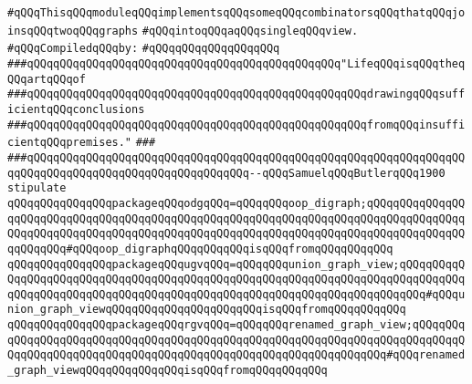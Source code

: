 \label{src/lib/graph/graph-combination.pkg}
\verb|#qQQqThisqQQqmoduleqQQqimplementsqQQqsomeqQQqcombinatorsqQQqthatqQQqjoinsqQQqtwoqQQqgraphs|\newline
\verb|#qQQqintoqQQqaqQQqsingleqQQqview.|\newline
\newline
\verb|#qQQqCompiledqQQqby:|\newline
\verb|#qQQqqQQqqQQqqQQqqQQq|\newline
\newline
\newline
\newline
\verb|###qQQqqQQqqQQqqQQqqQQqqQQqqQQqqQQqqQQqqQQqqQQqqQQq"LifeqQQqisqQQqtheqQQqartqQQqof|\newline
\verb|###qQQqqQQqqQQqqQQqqQQqqQQqqQQqqQQqqQQqqQQqqQQqqQQqqQQqdrawingqQQqsufficientqQQqconclusions|\newline
\verb|###qQQqqQQqqQQqqQQqqQQqqQQqqQQqqQQqqQQqqQQqqQQqqQQqqQQqfromqQQqinsufficientqQQqpremises."|\newline
\verb|###|\newline
\verb|###qQQqqQQqqQQqqQQqqQQqqQQqqQQqqQQqqQQqqQQqqQQqqQQqqQQqqQQqqQQqqQQqqQQqqQQqqQQqqQQqqQQqqQQqqQQqqQQqqQQqqQQq--qQQqSamuelqQQqButlerqQQq1900|\newline
\newline
\newline
\newline
\verb|stipulate|\newline
\verb|qQQqqQQqqQQqqQQqpackageqQQqodgqQQq=qQQqqQQqoop_digraph;qQQqqQQqqQQqqQQqqQQqqQQqqQQqqQQqqQQqqQQqqQQqqQQqqQQqqQQqqQQqqQQqqQQqqQQqqQQqqQQqqQQqqQQqqQQqqQQqqQQqqQQqqQQqqQQqqQQqqQQqqQQqqQQqqQQqqQQqqQQqqQQqqQQqqQQqqQQqqQQqqQQq#qQQqoop_digraphqQQqqQQqqQQqisqQQqfromqQQqqQQqqQQq|\newline
\verb|qQQqqQQqqQQqqQQqpackageqQQqugvqQQq=qQQqqQQqunion_graph_view;qQQqqQQqqQQqqQQqqQQqqQQqqQQqqQQqqQQqqQQqqQQqqQQqqQQqqQQqqQQqqQQqqQQqqQQqqQQqqQQqqQQqqQQqqQQqqQQqqQQqqQQqqQQqqQQqqQQqqQQqqQQqqQQqqQQqqQQqqQQqqQQq#qQQqunion_graph_viewqQQqqQQqqQQqqQQqqQQqqQQqisqQQqfromqQQqqQQqqQQq|\newline
\verb|qQQqqQQqqQQqqQQqpackageqQQqrgvqQQq=qQQqqQQqrenamed_graph_view;qQQqqQQqqQQqqQQqqQQqqQQqqQQqqQQqqQQqqQQqqQQqqQQqqQQqqQQqqQQqqQQqqQQqqQQqqQQqqQQqqQQqqQQqqQQqqQQqqQQqqQQqqQQqqQQqqQQqqQQqqQQqqQQqqQQqqQQq#qQQqrenamed_graph_viewqQQqqQQqqQQqqQQqisqQQqfromqQQqqQQqqQQq|\newline
